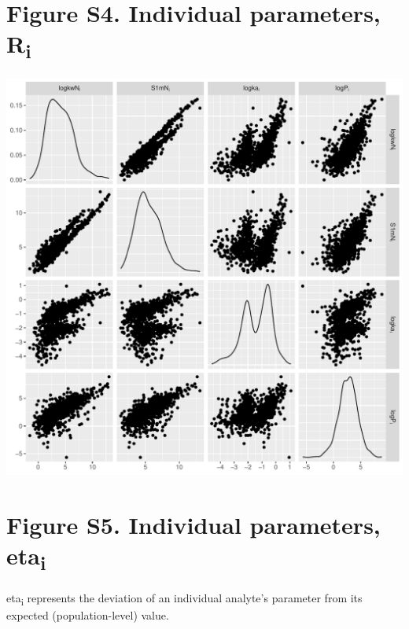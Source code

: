 \documentclass[
]{article}
\begin{document}
\newpage{}

\hypertarget{figure-s4.-individual-parameters-ri}{%
\section{\texorpdfstring{Figure S4. Individual parameters,
R\textsubscript{i}}{Figure S4. Individual parameters, Ri}}\label{figure-s4.-individual-parameters-ri}}

\includegraphics{../deliv/figures/manuscript/supplement/iparam.pdf}

\newpage{}

\hypertarget{figure-s5.-individual-parameters-etai}{%
\section{\texorpdfstring{Figure S5. Individual parameters,
eta\textsubscript{i}}{Figure S5. Individual parameters, etai}}\label{figure-s5.-individual-parameters-etai}}

eta\textsubscript{i} represents the deviation of an individual analyte's
parameter from its expected (population-level) value.
\end{document}
